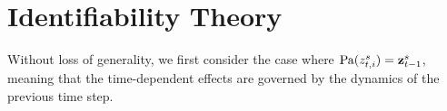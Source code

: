 \newcommand{\beginsupplement}{%
	\setcounter{table}{0}
	\renewcommand{\thetable}{A\arabic{table}}%

         \setcounter{equation}{0}
	\renewcommand{\theequation}{A\arabic{equation}}%
	
	\setcounter{figure}{0}
	\renewcommand{\thefigure}{A\arabic{figure}}%
	
	\setcounter{algorithm}{0}
	\renewcommand{\thealgorithm}{A\arabic{algorithm}}%
	
	\setcounter{section}{0}
	\renewcommand{\thesection}{A\arabic{section}}%

    \setcounter{theorem}{0}
    \renewcommand{\thetheorem}{A\arabic{theorem}}%



}
\beginsupplement

\appendix


\section{Identifiability Theory}
\label{ap_sec:theory}

Without loss of generality, we first consider the case where $\text{Pa}(z_{t,i}^s) = {\mathbf{z}}_{t-1}^s$, meaning that the time-dependent effects are governed by the dynamics of the previous time step.

